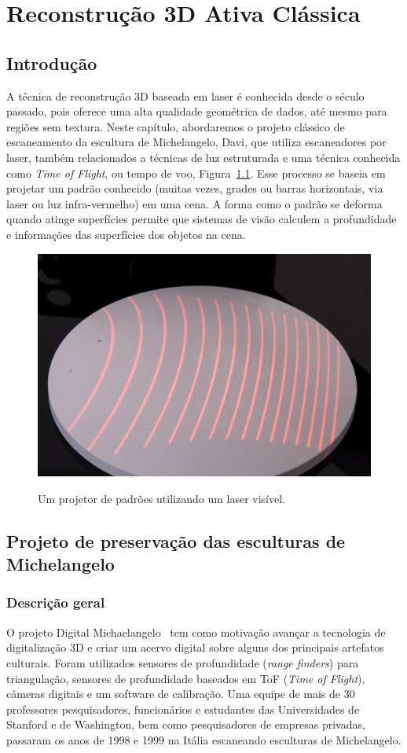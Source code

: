 \chapter{Reconstrução 3D Ativa Clássica}\label{cap:laser}

\section{Introdução}

A técnica de reconstrução 3D baseada em laser 
é conhecida desde o século
passado, pois oferece uma alta qualidade geométrica de dados, até mesmo para
regiões sem textura.  Neste capítulo, abordaremos o projeto clássico de escaneamento da
escultura de Michelangelo, Davi, que utiliza escaneadores 
por laser, também relacionados a técnicas de luz estruturada e
uma técnica conhecida como \emph{Time of Flight}, ou tempo de voo,
Figura~\ref{fig:luzestruturada}. Esse processo se baseia em projetar um padrão
conhecido (muitas vezes, grades ou barras horizontais, via laser ou luz infra-vermelho) em uma
cena. A forma como o padrão se deforma quando atinge superfícies permite que
sistemas de visão calculem a profundidade e informações das superfícies dos
objetos na cena.

\begin{figure}[!h]
	\centering
	\caption{%
		Um projetor de padrões utilizando um laser visível.
		}
	\includegraphics[width=0.4\linewidth]{figs/luzestruturada.jpg}
	\label{fig:luzestruturada}
\end{figure}


\section{Projeto de preservação das esculturas de Michelangelo}\label{sec:David}

\subsection{Descrição geral}

O projeto Digital Michaelangelo~\cite{levoy2000digital} tem como motivação
avançar a tecnologia de digitalização 3D e criar um acervo digital sobre alguns
dos principais artefatos culturais. Foram
utilizados sensores de profundidade (\emph{range finders}) para triangulação,
sensores de profundidade baseados em ToF (\emph{Time of Flight}), câmeras digitais e
um software de calibração. Uma equipe de mais de 30 professores pesquisadores,
funcionários e estudantes das Universidades de Stanford e de Washington, bem como pesquisadores de 
empresas privadas, passaram os anos de 1998 e
1999 na Itália escaneando esculturas de Michelangelo. 

